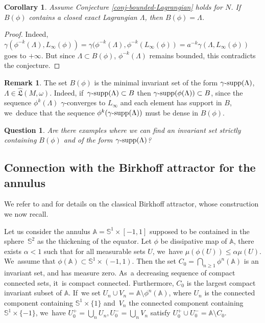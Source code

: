\documentclass[JEP,XML,SOM,Unicode,NoFloatCountersInSection,published]{cedram}
\newtheorem{cor}[thm]{Corollary}
\newtheorem{Question}[thm]{Question}
\theoremstyle{definition}
\newtheorem{rem}[thm]{Remark}
\DeclareMathOperator{\gammasupp}{\gamma\textup{-supp}}
\newcommand{\fL}{\mathfrak {L}}
\newcommand{\hatL}{\widehat{\fL}}
\begin{document}
\begin{cor} Assume Conjecture \ref{conj-bounded-Lagrangian} holds for $N$. If~$B(\phi)$ contains a closed exact Lagrangian $\Lambda$, then $B(\phi)=\Lambda$.
\end{cor}
\begin{proof}
Indeed, $\gamma(\phi^{-k}(\Lambda), L_\infty(\phi))=\gamma(\phi^{-k}(\Lambda), \phi^{-k}(L_\infty(\phi)) =a^{-k} \gamma(\Lambda, L_\infty(\phi)) $ goes to $+\infty$. But since $\Lambda \subset B(\phi)$, $\phi^{-k}(\Lambda)$ remains bounded, this contradicts the conjecture.
\end{proof}

\begin{rem}
The set
$B(\phi)$ is the minimal invariant set of the form
$\gammasupp(\Lambda)$, $\Lambda\in \hatL(M,\omega)$. Indeed, if~$\gammasupp(\Lambda) \subset B$
then $\gammasupp(\phi(\Lambda))\subset B$, since the sequence $\phi^k(\Lambda)$
$\gamma$\nobreakdash-converges to $L_\infty$ and each element has support in $B$, we~deduce that the sequence
$ \phi^k (\gammasupp(\Lambda))$ must be dense in $B(\phi)$.
\begin{Question}
Are there examples where we can find an invariant set strictly containing $B(\phi)$ and of the form $\gammasupp(\Lambda)$?
\end{Question}
\end{rem}

\subsection{Connection with the Birkhoff attractor for the annulus}\label{sec:connection-Birkhoff}
We refer to \cite{LeCalvez-Birkhoff1} and \cite{LeCalvez-Birkhoff2} for details on the classical Birkhoff attractor, whose construction we now recall.

Let us consider the annulus $\mathbb A= {\mathbb S}^{1}\times [-1,1]$ supposed to be contained in the sphere~$\mathbb S^{2}$ as the thickening of the equator. Let $\phi$ be dissipative map of $\mathbb A$, \ie there exists $\alpha<1$ such that for all measurable sets $U$, we~have $\mu (\phi(U))\leq \alpha \mu(U)$. We~assume that $\phi(\mathbb A)\subset {\mathbb S}^{1}\times (-1,1)$.
Then the set $C_{0}=\bigcap_{n\geq 1}\phi^{n}(\mathbb A)$ is an invariant set, and has measure zero. As~a decreasing sequence of compact connected sets, it~is compact connected. Furthermore, $C_0$ is the largest compact invariant subset of $\mathbb A$. If~we set $U_{n}\cup V_{n}= \mathbb A \setminus \phi^{n}(\mathbb A)$, where $U_{n}$ is the connected component containing $\mathbb S^{1} \times \{1\}$ and~$V_{n}$ the connected component containing $\mathbb S^{1} \times \{-1\}$, we~have $U_{0}^+=\bigcup_{n}U_{n}, U^{-}_{0}= \bigcup_{n}V_{n}$ satisfy $U_{0}^{+}\cup U^{-}_{0}=\mathbb A\setminus C_{0}$.
\end{document}
